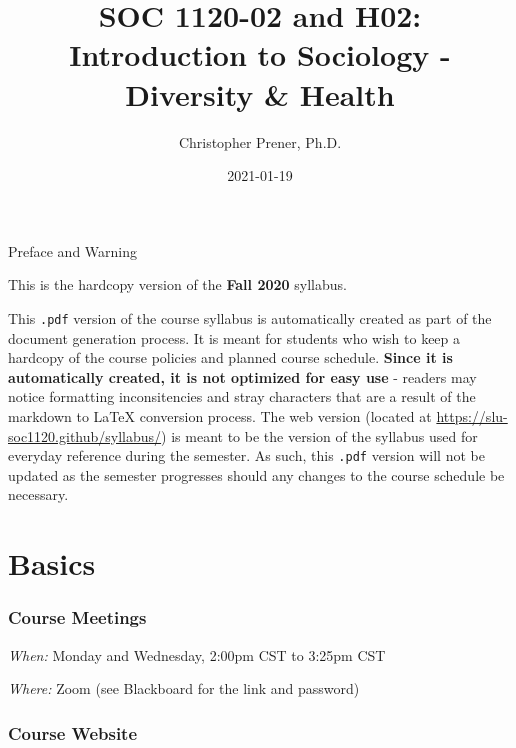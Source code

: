 \documentclass[
]{book}
\title{SOC 1120-02 and H02: Introduction to Sociology - Diversity \& Health}
\author{Christopher Prener, Ph.D.}
\date{2021-01-19}
\begin{document}
\maketitle

\begin{center}
{\huge Preface and Warning} \\
\end{center}
\vspace{5mm}
This is the hardcopy version of the \textbf{Fall 2020} syllabus.
\vspace{5mm}
\par \noindent This \texttt{.pdf} version of the course syllabus is automatically created as part of the document generation process. It is meant for students who wish to keep a hardcopy of the course policies and planned course schedule. \textbf{Since it is automatically created, it is not optimized for easy use} - readers may notice formatting inconsitencies and stray characters that are a result of the markdown to \LaTeX{} conversion process. The web version (located at \href{https://slu-soc1120.github/syllabus/}{https://slu-soc1120.github/syllabus/}) is meant to be the version of the syllabus used for everyday reference during the semester. As such, this \texttt{.pdf} version will not be updated as the semester progresses should any changes to the course schedule be necessary.

\hypertarget{basics}{%
\chapter*{Basics}\label{basics}}

\hypertarget{course-meetings}{%
\subsection*{Course Meetings}\label{course-meetings}}

\emph{When:} Monday and Wednesday, 2:00pm CST to 3:25pm CST

\emph{Where:} Zoom (see Blackboard for the link and password)

\hypertarget{course-website}{%
\subsection*{Course Website}\label{course-website}}
\end{document}
